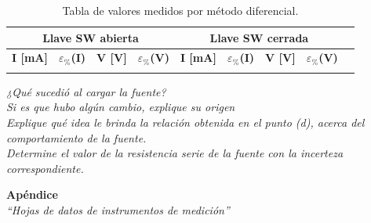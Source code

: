 \documentclass{article}
\begin{document}
\begin{table}[!hbt]
	\begin{center}

		\begin{tabular}{|c|c|c|c|c|c|c|c|c|} \hline
			\multicolumn{4}{|c|}{\textbf{Llave SW abierta}} & \multicolumn{4}{c|}{\textbf{Llave SW cerrada}} \\ \hline
			\textbf{I [mA]} & \textbf{$\varepsilon_{\%}$(I)} & \textbf{V [V]} & \textbf{$\varepsilon_{\%}$(V)} & \textbf{I [mA]} & \textbf{$\varepsilon_{\%}$(I)} & \textbf{V [V]} & \textbf{$\varepsilon_{\%}$(V)} \\\cline{1-8}
			 &  &  &  &  &  &  &  \\\cline{1-8}
		\end{tabular}

	\caption{Tabla de valores medidos por método diferencial.}
	\end{center}
\end{table}
\bigskip





\bigskip\bigskip
\textit{¿Qué sucedió al cargar la fuente?} \\

\textit{Si es que hubo algún cambio, explique su origen} \\

\textit{Explique qué idea le brinda la relación obtenida en el punto (d), acerca del comportamiento de la fuente.} \\

\textit{Determine el valor de la resistencia serie de la fuente con la incerteza correspondiente.} \\





\newpage
\vspace*{4cm}
\begin{center}
	\textbf{\Huge{Apéndice}} \\
	\bigskip\bigskip
	\Large{\textit{``Hojas de datos de instrumentos de medición''}}
\end{center}
\end{document}
